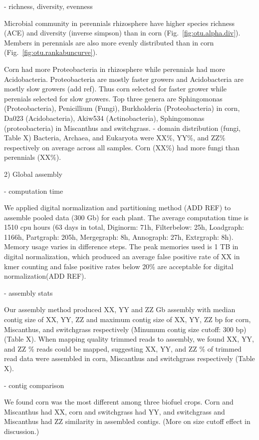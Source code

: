 \documentclass[12pt]{article}
\begin{document}
- richness, diversity, evenness

Microbial community in perennials rhizosphere have higher species richness (ACE) and diversity (inverse simpson) than in corn (Fig.~\ref{fig:otu.alpha.div}). Members in perennials are also more evenly distributed than in corn (Fig.~\ref{fig:otu.rankabuncurve}).

Corn had more Proteobacteria in rhizosphere while perennials had more Acidobacteria. Proteobacteria are mostly faster growers and Acidobacteria are mostly slow growers (add ref). Thus corn selected for faster grower while perenials selected for slow growers. Top three genera are Sphingomonas (Proteobacteria), Penicillium (Fungi), Burkholderia (Proteobacteria) in corn, Da023 (Acidobacteria), Akiw534 (Actinobacteria), Sphingomonas (proteobacteria) in Miscanthus and switchgrass. 
- domain distribution (fungi, Table X)
Bacteria, Archaea, and Eukaryota were XX\%, YY\%, and ZZ\% respectively on average across all samples. Corn (XX\%) had more fungi than perennials (XX\%).
  
2) Global assembly

- computation time

We applied digital normalization and partitioning method (ADD REF) to assemble pooled data (300 Gb) for each plant. The average computation time is 1510 cpu hours (63 days in total, Diginorm: 71h, Filterbelow: 25h, Loadgraph: 1166h, Partgraph: 205h, Mergegraph: 8h, Annograph: 27h, Extrgraph: 8h). Memory usage varies in difference steps. The peak memories used is 1 TB in digital normalization, which produced an average false positive rate of XX in kmer counting and false positive rates below 20\% are acceptable for digital normalization(ADD REF). 

- assembly stats

Our assembly method produced  XX, YY and ZZ Gb assembly with median contig size of XX, YY, ZZ and maximum contig size of XX, YY, ZZ bp for corn, Miscanthus, and switchgrass respectively (Minumum contig size cutoff: 300 bp)(Table X). When mapping quality trimmed reads to assembly, we found XX, YY, and ZZ \% reads could be mapped, suggesting XX, YY, and ZZ \% of trimmed read data were assembled in corn, Miscanthus and switchgrass respectively (Table X).

- contig comparison

We found corn was the most different among three biofuel crops.  Corn and Miscanthus had XX, corn and switchgrass had YY, and switchgrass and Miscanthus had ZZ similarity in assembled contigs. (More on size cutoff effect in discussion.)
\end{document}
